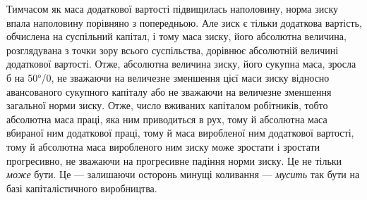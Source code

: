 \documentclass[12pt, a4paper, final]{memoir}
\begin{document}
Тимчасом як маса додаткової вартості підвищилась наполовину, норма зиску впала наполовину порівняно з попередньою. Але зиск є тільки додаткова вартість, обчислена на суспільний капітал, і тому маса зиску, його абсолютна величина, розглядувана з точки зору всього суспільства, дорівнює абсолютній величині додаткової вартості. Отже, абсолютна величина зиску, його сукупна маса, зросла б на 50°/0, не зважаючи на величезне зменшення цієї маси зиску відносно авансованого сукупного капіталу або не зважаючи на величезне зменшення загальної норми зиску. Отже, число вживаних капіталом робітників, тобто абсолютна маса праці, яка ним приводиться в рух, тому й абсолютна маса вбираної ним додаткової праці, тому й маса виробленої ним додаткової вартості, тому й абсолютна маса виробленого ним зиску може зростати і зростати прогресивно, не зважаючи на прогресивне падіння норми зиску. Це не тільки \emph{може} бути. Це — залишаючи осторонь минущі коливання — \emph{мусить} так бути на базі капіталістичного виробництва.
\end{document}
